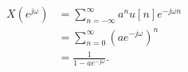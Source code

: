 \begin{frame}
    {
        \begin{align*}
            X(e^{j\omega}) &= \sum_{n=-\infty}^{\infty} a^nu[n]e^{-j\omega n}\\
            &= \sum_{n = 0}^{\infty} (ae^{-j\omega})^n\\
            &= \frac{1}{1-ae^{-j\omega}}.
        \end{align*}
    }
\end{frame}

\begin{frame}
    {
        \begin{figure}
            \centering
            
        \end{figure}
        
    }
\end{frame}
